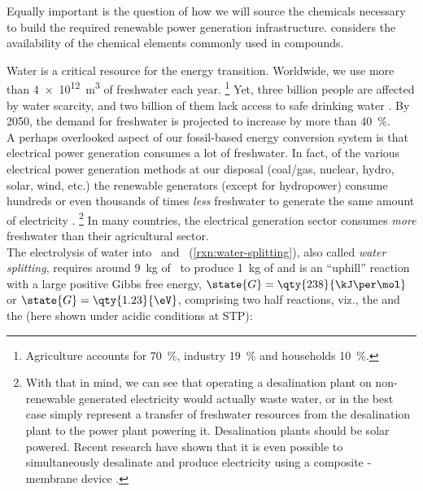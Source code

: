 \documentclass[draft,webedition,openright,titles,swedish,english]{LuaUUThesis}\usepackage[]{graphicx}\usepackage[]{xcolor}
\newcommand{\viz}{viz.}
\newcommand{\namely}{\viz}
\newcommand{\etc}{etc.}
\begin{document}
Equally important is the question of how we will source the chemicals
necessary to build the required renewable power generation infrastructure.
 considers the availability of the chemical
elements commonly used in  compounds.


Water is a critical resource for the energy transition.
Worldwide, we use more than \qty{4e12}{\cubic\metre} of freshwater each year.%
\footnote{Agriculture accounts for \qty{70}{\percent}, industry \qty{19}{\percent} and households \qty{10}{\percent}.}
Yet, three billion people are affected by water scarcity, and two billion of them
lack access to safe drinking water \cite{WWAP2020}.
By 2050, the demand for freshwater is projected to increase by more than \qty{40}{\percent}.\\
A perhaps overlooked aspect of our fossil-based
energy conversion system is that electrical power generation consumes a lot of freshwater.
In fact, of the various electrical power generation methods at our
disposal (coal/gas, nuclear, hydro, solar, wind, \etc) the renewable
generators (except for hydropower) consume hundreds or even thousands of times
\emph{less} freshwater to generate the same amount of electricity \cite{Wilson2012}.%
\footnote{%
   With that in mind, we can see that operating a desalination plant on
   non-renewable generated electricity would actually waste water, or in the best case
   simply represent a transfer of freshwater resources from the desalination plant
   to the power plant powering it.
   Desalination plants should be solar powered. Recent research have shown
   that it is even possible to simultaneously desalinate and produce electricity
   using a composite -membrane device \cite{Wang2019}.
}
In many countries, the electrical generation sector consumes \emph{more} freshwater
than their agricultural sector.\\
The electrolysis of water into \hydrogen\ and \oxygen\ (\cref{rxn:water-splitting}),
also called \emph{water splitting}, requires around \qty{9}{\kg}
of \water\ to produce \qty{1}{\kg} of \hydrogen
and is an \enquote{uphill} reaction with a large positive Gibbs free energy,
$\state{G}=\qty{238}{\kJ\per\mol}$ or $\state{G}=\qty{1.23}{\eV}$,
comprising two half reactions, \namely, the  and the 
(here shown under acidic conditions at \gls{STP}):
\clearpage
\end{document}
